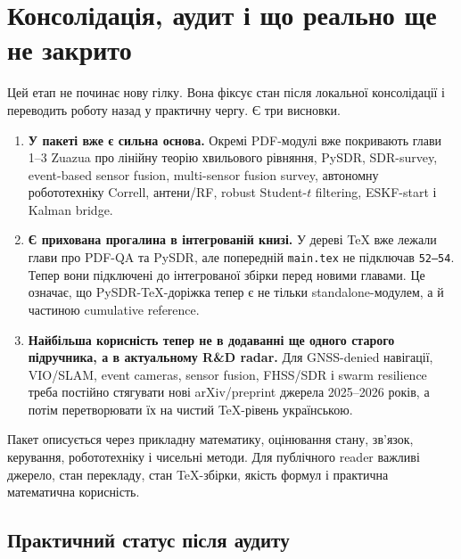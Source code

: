 \chapter{Консолідація, аудит і що реально ще не закрито}

Цей етап не починає нову гілку. Вона фіксує стан після локальної консолідації і переводить роботу назад у практичну чергу. Є три висновки.

\begin{enumerate}[leftmargin=2em]
\item \textbf{У пакеті вже є сильна основа.} Окремі PDF-модулі вже покривають глави 1--3 Zuazua про лінійну теорію хвильового рівняння, PySDR, SDR-survey, event-based sensor fusion, multi-sensor fusion survey, автономну робототехніку Correll, антени/RF, robust Student-$t$ filtering, ESKF-start і Kalman bridge.
\item \textbf{Є прихована прогалина в інтегрованій книзі.} У дереві TeX вже лежали глави про PDF-QA та PySDR, але попередній \texttt{main.tex} не підключав \texttt{52--54}. Тепер вони підключені до інтегрованої збірки перед новими главами. Це означає, що PySDR-TeX-доріжка тепер є не тільки standalone-модулем, а й частиною cumulative reference.
\item \textbf{Найбільша корисність тепер не в додаванні ще одного старого підручника, а в актуальному R\&D radar.} Для GNSS-denied навігації, VIO/SLAM, event cameras, sensor fusion, FHSS/SDR і swarm resilience треба постійно стягувати нові arXiv/preprint джерела 2025--2026 років, а потім перетворювати їх на чистий TeX-рівень українською.
\end{enumerate}

Пакет описується через прикладну математику, оцінювання стану, зв'язок, керування, робототехніку і чисельні методи. Для публічного reader важливі джерело, стан перекладу, стан TeX-збірки, якість формул і практична математична корисність.

\section*{Практичний статус після аудиту}


